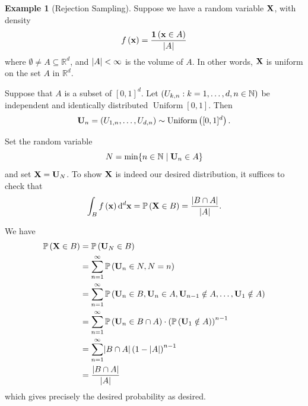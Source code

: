 \documentclass{article}
\theoremstyle{definition}
\newtheorem{example}[theorem]{Example}
\theoremstyle{remark}
\DeclarePairedDelimiter{\abs}{\lvert}{\rvert}
\newcommand{\RR}{\mathbb{R}}
\newcommand{\NN}{\mathbb{N}}
\newcommand{\Prob}{\mathbb{P}}
\newcommand{\indicator}{\mathbf{1}}
\newcommand{\ccintv}[2]{[#1,#2]}
\newcommand{\set}[2]{\{#1\mid #2\}}
\newcommand{\Uniform}{\operatorname{Uniform}}
\begin{document}
\begin{example}[Rejection Sampling]
    \label{ex:rejection-sampling}%
    Suppose we have a random variable \(\vb{X}\), with density
    \[
        f\pqty{\vb{x}} = \frac{\indicator \pqty{\vb{x} \in A}}{\abs{A}}
    \]
    where \(\emptyset \neq A \subseteq \RR^d\), and \(\abs{A} < \infty\) is the volume of \(A\). In other words, \(\vb{X}\) is uniform on the set \(A\) in \(\RR^d\).

    Suppose that \(A\) is a subset of \(\ccintv{0}{1}^d\). Let \(\pqty{U_{k, n} : k = 1, \ldots, d, n \in \NN}\) be independent and identically distributed \(\Uniform \ccintv{0}{1}\). Then
    \[
        \vb{U}_n = \pqty{U_{1, n}, \ldots, U_{d, n}} \sim \Uniform\pqty{\ccintv{0}{1}^d}.
    \]

    Set the random variable
    \[
        N = \min \set{n \in \NN}{\vb{U}_n \in A}
    \]
    and set \(\vb{X} = \vb{U}_N\). To show \(\vb{X}\) is indeed our desired distribution, it suffices to check that
    \[
        \int_{B} f\pqty{\vb{x}} \dd[d]{\vb{x}} = \Prob\pqty{\vb{X} \in B} = \frac{\abs{B \cap A}}{\abs{A}}.
    \]

    We have
    \begin{align*}
        \Prob\pqty{\vb{X} \in B} &= \Prob\pqty{\vb{U}_N \in B} \\
        &= \sum_{n = 1}^{\infty} \Prob\pqty{\vb{U}_n \in N, N = n} \\
        &= \sum_{n = 1}^{\infty} \Prob\pqty{\vb{U}_n \in B, \vb{U}_n \in A, \vb{U}_{n - 1} \notin A, \ldots, \vb{U}_1 \notin A} \\
        &= \sum_{n = 1}^{\infty} \Prob\pqty{\vb{U}_n \in B \cap A} \cdot \pqty{\Prob\pqty{\vb{U}_1 \notin A}}^{n - 1} \\
        &= \sum_{n = 1}^{\infty} \abs{B \cap A} \pqty{1 - \abs{A}}^{n - 1} \\
        &= \frac{\abs{B \cap A}}{\abs{A}}
    \end{align*}
    which gives precisely the desired probability as desired.
\end{example}
\end{document}
